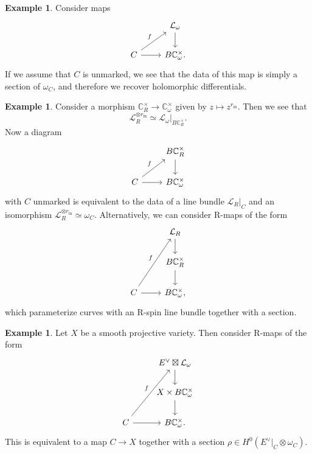 \documentclass{amsart}
\theoremstyle{definition}
\newtheorem{exm}[thm]{Example}
\theoremstyle{remark}
\theoremstyle{plain}
\theoremstyle{definition}
\theoremstyle{remark}
\newcommand{\C}{\mathbb{C}}
\newcommand{\mc}[1]{\mathcal{#1}}
\newcommand{\mr}[1]{\mathrm{#1}}
\newcommand{\1}{\mathbf{1}}
\newcommand{\2}{\mathbf{2}}
\newcommand{\3}{\mathbf{3}}
\begin{document}
\begin{exm}
    Consider maps
    \begin{equation*}
    \begin{tikzcd}
        & \mc{L}_{\omega} \ar{d} \\
        C \ar{ur}{f} \ar{r} & B \C_{\omega}^{\times}.
    \end{tikzcd}
    \end{equation*}
    If we assume that \(C\) is unmarked, we see that the data of this map is simply a section of \(\omega_C\), and therefore we recover holomorphic differentials.
\end{exm}

\begin{exm}
    Consider a morphism \(\C^{\times}_R \to \C^{\times}_{\omega}\) given by \(z \mapsto z^{r_{\mr{in}}}\). Then we see that
    \[ \mc{L}_R^{\otimes r_{\mr{in}}} \simeq \mc{L}_{\omega} |_{B \C_R^{\times}}. \]
    Now a diagram
    \begin{equation*}
    \begin{tikzcd}
        & B \C_R^{\times} \ar{d} \\
        C \ar{ur}{f} \ar{r} & B \C_{\omega}^{\times}
    \end{tikzcd}
    \end{equation*}
    with \(C\) unmarked is equivalent to the data of a line bundle \(\mc{L}_R|_C\) and an isomorphism \(\mc{L}_R^{\otimes r_{\mr{in}}} \simeq \omega_C\). Alternatively, we can consider R-maps of the form
    \begin{equation*}
    \begin{tikzcd}
        & \mc{L}_R \ar{d} \\
        & B \C_R^{\times} \ar{d} \\
        C \ar{uur}{f} \ar{r} & B \C_{\omega}^{\times},
    \end{tikzcd}
    \end{equation*}
    which parameterize curves with an R-spin line bundle together with a section.
\end{exm}

\begin{exm}
    Let \(X\) be a smooth projective variety. Then consider R-maps of the form
    \begin{equation*}
    \begin{tikzcd}
        & E^{\vee} \boxtimes \mc{L}_{\omega} \ar{d} \\
        & X \times B \C_{\omega}^{\times} \ar{d} \\
        C \ar{uur}{f} \ar{r} & B \C_{\omega}^{\times}.
    \end{tikzcd}
    \end{equation*}
    This is equivalent to a map \(C \to X\) together with a section \(\rho \in H^0(E^{\vee}|_C \otimes \omega_C)\).
\end{exm}
\end{document}
